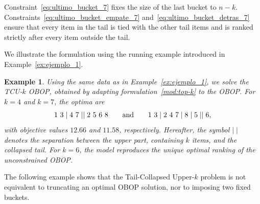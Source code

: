 \documentclass[pdflatex,basic,Numbered]{jnl}%
\theoremstyle{plain}
\newtheorem{example}{Example}
\theoremstyle{remark}
\theoremstyle{thmstyleone}%
\theoremstyle{thmstylethree}%
\begin{document}
Constraint~\eqref{eq:ultimo_bucket_7} fixes the size of the last bucket to \(n-k\). Constraints~\eqref{eq:ultimo_bucket_empate_7} and~\eqref{eq:ultimo_bucket_detras_7} ensure that every item in the tail is tied with the other tail items and is ranked strictly after every item outside the tail.

We illustrate the formulation using the running example introduced in Example~\ref{ex:ejemplo_1}.

\begin{example}\label{ex:ejemplo_6}
Using the same data as in Example~\ref{ex:ejemplo_1}, we solve the {\rm TCU-\(k\) OBOP}, obtained by adapting formulation~\eqref{mod:top-k} to the {\rm OBOP}. For \(k=4\) and \(k=7\), the optima are
\[
{\rm 1\ 3 \mid 4\ 7 \mid\mid 2\ 5\ 6\ 8}
\qquad\text{and}\qquad
{\rm 1\ 3 \mid 2\ 4\ 7 \mid 8 \mid 5 \mid\mid 6},
\]
with objective values \(12.66\) and \(11.58\), respectively. Hereafter, the symbol \(\mid\mid\) denotes the separation between the upper part, containing \(k\) items, and the collapsed tail. For \(k=6\), the model reproduces the unique optimal ranking of the unconstrained {\rm OBOP}.
\end{example}

The following example shows that the Tail-Collapsed Upper-\(k\) problem is not equivalent to truncating an optimal OBOP solution, nor to imposing two fixed buckets.
\end{document}
